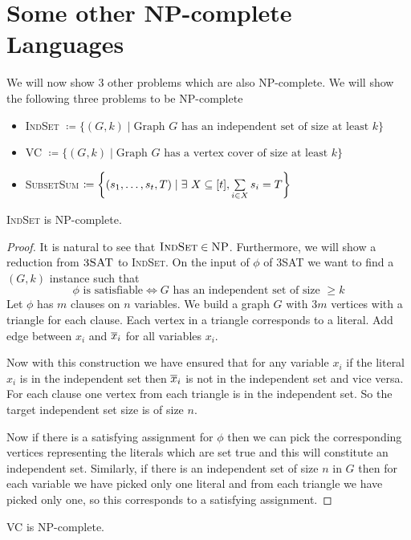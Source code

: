 \section{Some other \textsc{NP}-complete Languages}
We will now show 3 other problems which are also \textsc{NP}-complete. We will show the following three problems to be \textsc{NP}-complete\begin{itemize}
    \item \textsc{IndSet} $\coloneqq\{(G,k)\mid \text{Graph }G\text{ has an independent set of size at least $k$}\}$
    \item \textsc{VC} $\coloneqq\{(G,k)\mid \text{Graph }G\text{ has a vertex cover of size at least $k$}\}$
    \item \textsc{SubsetSum} $\coloneqq\lt\{(s_1,\dots, s_t, T)\mid \exs\ X\subseteq [t], \sum\limits_{i\in X}s_i=T\rt\}$
\end{itemize}
\begin{Theorem}{}{}
\textsc{IndSet} is \textsc{NP}-complete.
\end{Theorem}
\begin{proof}
    It is natural to see that $\textsc{IndSet}\in\textsc{NP}$. Furthermore, we will show a reduction from $\textsc{3SAT}$ to \textsc{IndSet}. On the input of $\phi$ of \textsc{3SAT} we want to find a $(G,k)$ instance such that $$\phi\text{ is satisfiable}\iff G\text{ has an independent set of size $\geq k$}$$Let $\phi$ has $m$ clauses on $n$ variables. We build a graph $G$ with $3m$ vertices with a triangle for each clause. Each vertex in a triangle corresponds to a literal. Add edge between $x_i$ and $\overline{x}_i$ for all variables $x_i$. 

    Now with this construction we have ensured that for any variable $x_i$ if the literal $x_i$ is in the independent set then $\overline{x}_i$ is not in the independent set and vice versa. For each clause one vertex from each triangle is in the independent set. So the target independent set size is of size $n$. 

    Now if there is a satisfying assignment for $\phi$ then we can pick the corresponding vertices representing the literals which are set true and this will constitute an independent set. Similarly, if there is an independent set of size $n$ in $G$ then for each variable we have picked only one literal and from each triangle we have picked only one, so this corresponds to a satisfying assignment.
\end{proof}
\begin{Theorem}{}{}
\textsc{VC} is \textsc{NP}-complete.
\end{Theorem}
